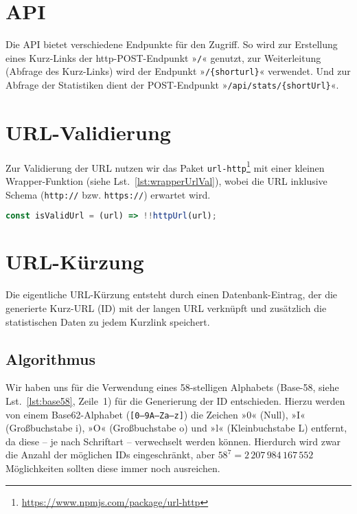 \documentclass[a4paper,11pt,DIV=12]{scrreprt}%
\begin{document}
\section{API}
Die \ac{API} bietet verschiedene Endpunkte für den Zugriff. So wird zur Erstellung eines Kurz-Links der http-POST-Endpunkt »\texttt{/}« genutzt, zur Weiterleitung (Abfrage des Kurz-Links) wird der Endpunkt »\texttt{/\{shorturl\}}« verwendet. Und zur Abfrage der Statistiken dient der POST-Endpunkt »\texttt{/api/stats/\{shortUrl\}}«. 
\section{URL-Validierung}
Zur Validierung der URL nutzen wir das Paket \texttt{url-http}\footnote{\href{https://www.npmjs.com/package/url-http}{https://www.npmjs.com/package/url-http}} mit einer kleinen Wrapper-Funktion (siehe Lst.~\ref{lst:wrapperUrlVal}), wobei die \ac{URL} inklusive Schema (\texttt{http://} bzw. \texttt{https://}) erwartet wird.

\begin{lstlisting}[language=JavaScript,
    caption={Wrapper-Funktion zur URL-Validierung},
    label={lst:wrapperUrlVal},
    float=h,
    gobble=4
]
    const isValidUrl = (url) => !!httpUrl(url);
\end{lstlisting}


\section{URL-Kürzung}
Die eigentliche URL-Kürzung entsteht durch einen Datenbank-Eintrag, der die generierte Kurz-\ac{URL} (ID) mit der langen \ac{URL} verknüpft und zusätzlich die statistischen Daten zu jedem Kurzlink speichert.
\subsection{Algorithmus}
Wir haben uns für die Verwendung eines 58-stelligen Alphabets (Base-58\label{sec:base58}, siehe Lst.~\ref{lst:base58}, Zeile~1) für die Generierung der ID entschieden. Hierzu werden von einem Base62-Alphabet (\texttt{[0–9A–Za–z]}) die Zeichen »0« (Null), »I« (Großbuchstabe i), »O« (Großbuchstabe o) und »l« (Kleinbuchstabe L) entfernt, da diese – je nach Schriftart – verwechselt werden können. Hierdurch wird zwar die Anzahl der möglichen IDs eingeschränkt, aber $58^7 =  2\,207\,984\,167\,552$ Möglichkeiten sollten diese immer noch ausreichen.
\end{document}
